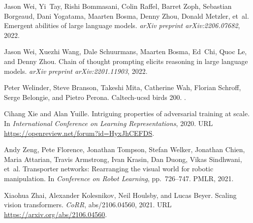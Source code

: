 \documentclass{article} %
\begin{document}
\begin{thebibliography}{67}
Jason Wei, Yi~Tay, Rishi Bommasani, Colin Raffel, Barret Zoph, Sebastian
  Borgeaud, Dani Yogatama, Maarten Bosma, Denny Zhou, Donald Metzler, et~al.
\newblock Emergent abilities of large language models.
\newblock \emph{arXiv preprint arXiv:2206.07682}, 2022{}.

Jason Wei, Xuezhi Wang, Dale Schuurmans, Maarten Bosma, Ed~Chi, Quoc Le, and
  Denny Zhou.
\newblock Chain of thought prompting elicits reasoning in large language
  models.
\newblock \emph{arXiv preprint arXiv:2201.11903}, 2022{}.

Peter Welinder, Steve Branson, Takeshi Mita, Catherine Wah, Florian Schroff,
  Serge Belongie, and Pietro Perona.
\newblock Caltech-ucsd birds 200.
.

Cihang Xie and Alan Yuille.
\newblock Intriguing properties of adversarial training at scale.
\newblock In \emph{International Conference on Learning Representations}, 2020.
\newblock URL \url{https://openreview.net/forum?id=HyxJhCEFDS}.

Andy Zeng, Pete Florence, Jonathan Tompson, Stefan Welker, Jonathan Chien,
  Maria Attarian, Travis Armstrong, Ivan Krasin, Dan Duong, Vikas Sindhwani,
  et~al.
\newblock Transporter networks: Rearranging the visual world for robotic
  manipulation.
\newblock In \emph{Conference on Robot Learning}, pp.\  726--747. PMLR, 2021.

Xiaohua Zhai, Alexander Kolesnikov, Neil Houlsby, and Lucas Beyer.
\newblock Scaling vision transformers.
\newblock \emph{CoRR}, abs/2106.04560, 2021.
\newblock URL \url{https://arxiv.org/abs/2106.04560}.

\end{thebibliography}




\end{document}
